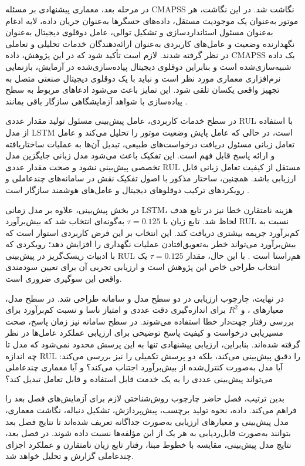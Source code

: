 در مرحله بعد، معماری پیشنهادی بر مسئله \gls{CMAPSS} نگاشت شد. در
این نگاشت، هر موتور به‌عنوان یک موجودیت مستقل، داده‌های حسگرها
به‌عنوان جریان داده، لایه ادغام به‌عنوان مسئول استانداردسازی و
تشکیل توالی، عامل دوقلوی دیجیتال به‌عنوان نگهدارنده وضعیت و
عامل‌های کاربردی به‌عنوان ارائه‌دهندگان خدمات تحلیلی و تعاملی
در نظر گرفته شدند. لازم است تأکید شود که در این پژوهش، داده
\gls{CMAPSS} یک داده شبیه‌سازی‌شده است و بنابراین دوقلوی دیجیتال
پیاده‌سازی‌شده در آزمایش، بازنمایی نرم‌افزاری معماری مورد نظر
است و نباید با یک دوقلوی دیجیتال صنعتی متصل به تجهیز واقعی
یکسان تلقی شود. این تمایز باعث می‌شود ادعاهای مربوط به سطح
پیاده‌سازی با شواهد آزمایشگاهی سازگار باقی بمانند
\cite{qi2021enabling,tao2018digital}.

در سطح خدمات کاربردی، عامل پیش‌بینی مسئول تولید مقدار عددی
\gls{RUL} با استفاده از مدل \gls{LSTM} است، در حالی که عامل
پایش وضعیت موتور را تحلیل می‌کند و عامل تعامل زبانی مسئول
دریافت درخواست‌های طبیعی، تبدیل آن‌ها به عملیات ساختاریافته و
ارائه پاسخ قابل فهم است. این تفکیک باعث می‌شود مدل زبانی جایگزین
مدل تخصصی پیش‌بینی نشود و صحت مقدار عددی \gls{RUL} مستقل از
کیفیت تعامل زبانی قابل ارزیابی باشد. همچنین، ساختار مذکور با
اصول تفکیک نقش در سامانه‌های چندعاملی و رویکردهای ترکیب
دوقلوهای دیجیتال و عامل‌های هوشمند سازگار است
\cite{lopez2024madtwin,pretel2022masdt}.

در بخش پیش‌بینی، علاوه بر مدل زمانی \gls{LSTM}، هزینه نامتقارن
خطا نیز در تابع هدف لحاظ شد. تابع زیان  با
$\tau=0.125$ به‌گونه‌ای انتخاب شد که بیش‌برآورد \gls{RUL} نسبت
به کم‌برآورد جریمه بیشتری دریافت کند. این انتخاب بر این فرض
کاربردی استوار است که بیش‌برآورد می‌تواند خطر به‌تعویق‌افتادن
عملیات نگهداری را افزایش دهد؛ رویکردی که با ادبیات
ریسک‌گریز در پیش‌بینی \gls{RUL} هم‌راستا است
\cite{Robinson2026riskaware}. با این حال، مقدار $\tau=0.125$
یک انتخاب طراحی خاص این پژوهش است و ارزیابی تجربی آن برای
تعیین سودمندی واقعی این سوگیری ضروری است.

در نهایت، چارچوب ارزیابی در دو سطح مدل و سامانه طراحی شد. در
سطح مدل، معیارهای ،  و $R^2$ برای اندازه‌گیری
دقت عددی و امتیاز ناسا و نسبت کم‌برآورد برای بررسی رفتار
جهت‌دار خطا استفاده می‌شوند. در سطح سامانه نیز زمان پاسخ،
صحت مسیریابی درخواست و کیفیت پاسخ توضیحی برای ارزیابی عملکرد
عامل‌ها در نظر گرفته شده‌اند. بنابراین، ارزیابی پیشنهادی تنها
به این پرسش محدود نمی‌شود که مدل تا چه اندازه \gls{RUL} را
دقیق پیش‌بینی می‌کند، بلکه دو پرسش تکمیلی را نیز بررسی می‌کند:
آیا مدل به‌صورت کنترل‌شده از بیش‌برآورد اجتناب می‌کند؟ و آیا
معماری چندعاملی می‌تواند پیش‌بینی عددی را به یک خدمت قابل
استفاده و قابل تعامل تبدیل کند؟

بدین ترتیب، فصل حاضر چارچوب روش‌شناختی لازم برای آزمایش‌های فصل
بعد را فراهم می‌کند. داده، نحوه تولید برچسب، پیش‌پردازش، تشکیل
دنباله، نگاشت معماری، مدل پیش‌بینی و معیارهای ارزیابی به‌صورت
جداگانه تعریف شده‌اند تا نتایج فصل بعد بتوانند به‌صورت
قابل‌ردیابی به هر یک از این مؤلفه‌ها نسبت داده شوند. در فصل
بعد، نتایج مدل پیش‌بینی، مقایسه با خطوط مبنا، رفتار تابع زیان
نامتقارن و عملکرد اجزای چندعاملی گزارش و تحلیل خواهد شد.
